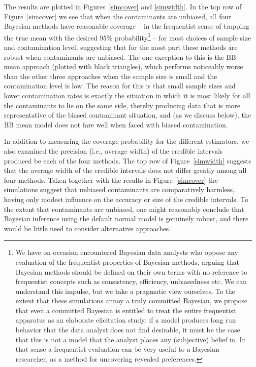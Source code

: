 \documentclass[doc]{apa6}
\begin{document}
{The results are plotted in Figures~\ref{simcover} and \ref{simwidth}. In the top row of Figure~\ref{simcover} we see that when the contaminants are unbiased, all four Bayesian methods have reasonable coverage -- in the frequentist sense of trapping the true mean with the desired 95\% probability\footnote{We have on occasion encountered Bayesian data analysts who oppose any evaluation of the frequentist properties of Bayesian methods, arguing that Bayesian methods should be defined on their own terms with no reference to frequentist concepts such as consistency, efficiency, unbiasedness etc. We can understand this impulse, but we take a pragmatic view ourselves. To the extent that these simulations annoy a truly committed Bayesian, we propose that even a committed Bayesian is entitled to treat the entire frequentist apparatus as an elaborate elicitation study: if a model produces long run behavior that the data analyst does not find desirable, it must be the case that this is not a model that the analyst places any (subjective) belief in. In that sense a frequentist evaluation can be very useful to a Bayesian researcher, as a method for uncovering revealed preferences.} -- for most choices of sample size and contamination level, suggesting that for the most part these methods are robust when contaminants are unbiased. The one exception to this is the BB mean approach (plotted with black triangles), which performs noticeably worse than the other three approaches when the sample size is small and the contamination level is low. The reason for this is that small sample sizes and lower contamination rates is exactly the situation in which it is most likely for all the contaminants to lie on the same side,  thereby producing data that is more representative of the biased    contaminant   situation, and (as we discuss below), the BB mean model does not fare well when faced with biased contamination.

In addition to measuring the coverage probability for the different estimators, we also examined the precision (i.e., average width) of the credible intervals produced be each of the four methods. The top row of Figure~\ref{simwidth} suggests that the average width of the credible intervals does not differ greatly among all four methods. Taken together with the results in Figure~\ref{simcover} the simulations suggest that unbiased contaminants are comparatively harmless, having only modest influence on the accuracy or size of the credible intervals. To the extent that contaminants are unbiased, one might reasonably conclude that Bayesian inference using the default normal model is genuinely robust, and there would be little need to consider alternative approaches.

}
\end{document}
